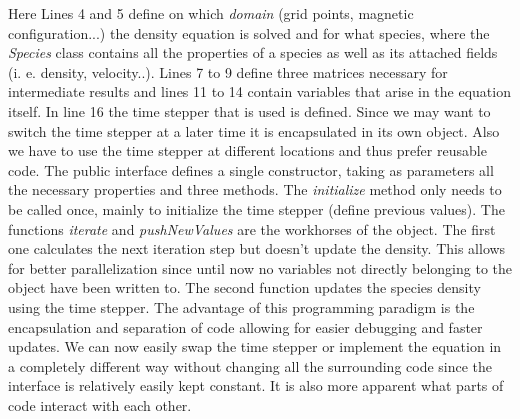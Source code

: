 \documentclass[master.tex]{subfiles}
\begin{document}
Here Lines 4 and 5 define on which \textit{domain} (grid points, magnetic configuration...) the density equation is solved and for what species, where the \textit{Species} class contains all the properties of a species as well as its attached fields (i. e. density, velocity..).\newline
Lines 7 to 9 define three matrices necessary for intermediate results and lines 11 to 14 contain variables that arise in the equation itself.  In line 16 the time stepper that is used is defined. Since we may want to switch the time stepper at a later time it is encapsulated in its own object. Also we have to use the time stepper at different locations and thus prefer reusable code.\newline
The public interface defines a single constructor, taking as parameters all the necessary properties and three methods. The \textit{initialize} method only needs to be called once, mainly to initialize the time stepper (define previous values).
The functions \textit{iterate} and \textit{pushNewValues} are the workhorses of the object. The first one calculates the next iteration step but doesn't update the density. This allows for better parallelization since until now no variables not directly belonging to the object have been written to. The second function updates the species density using the time stepper.\newline
The advantage of this programming paradigm is the encapsulation and separation of code allowing for easier debugging and faster updates. We can now easily swap the time stepper or implement the equation in a completely different way without changing all the surrounding code since the interface is relatively easily kept constant. It is also more apparent what parts of code interact with each other.
\end{document}
